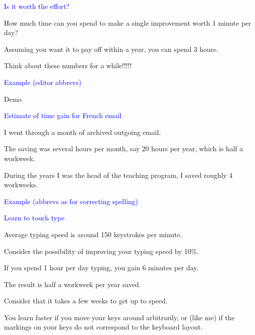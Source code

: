 \documentclass{slides}
\newcommand{\ti}[1]{\begin{center}\Large{\textcolor{blue}{#1}}\end{center}}
\begin{document}
\begin{slide}\ti{Is it worth the effort?}

How much time can you spend to make a single improvement worth 1
minute per day?

Assuming you want it to pay off within a year, you can spend 3 hours.

Think about these numbers for a while!!!!!

\vfill\end{slide}
\begin{slide}\ti{Example (editor abbrevs)}

Demo

\vfill\end{slide}
\begin{slide}\ti{Estimate of time gain for French email}

I went through a month of archived outgoing email.

The saving was several hours per month, say 20 hours per year, which
is half a workweek.

During the years I was the head of the teaching program, I saved
roughly 4 workweeks.

\vfill\end{slide}
\begin{slide}\ti{Example (abbrevs as for correcting spelling)}

\vfill\end{slide}
\begin{slide}\ti{Learn to touch type}

Average typing speed is around 150 keystrokes per minute.

Consider the possibility of improving your typing speed by 10\%. 

If you spend 1 hour per day typing, you gain 6 minutes per day.

The result is half a workweek per year saved.

Consider that it takes a few weeks to get up to speed.

You learn faster if you move your keys around arbitrarily, or (like
me) if the markings on your keys do not correspond to the keyboard
layout.

\vfill\end{slide}
\end{document}

